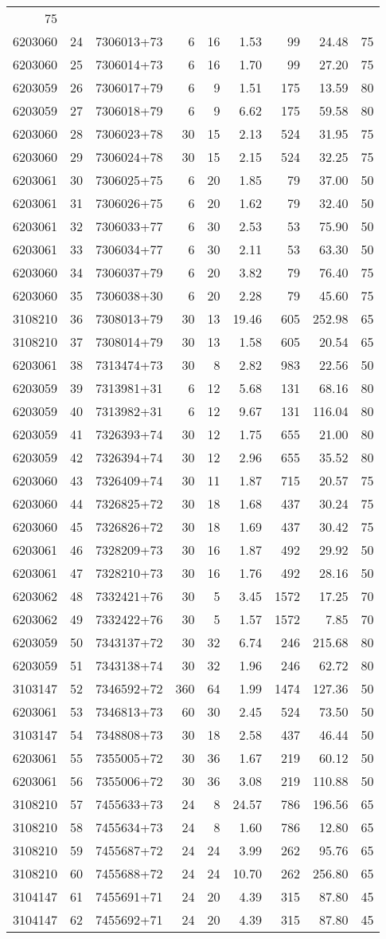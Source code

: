 \documentclass[
]{article}
\begin{document}
\begin{longtable}[]{@{}rrlrrrrrr@{}}
75\tabularnewline
6203060 & 24 & 7306013+73 & 6 & 16 & 1.53 & 99 & 24.48 &
75\tabularnewline
6203060 & 25 & 7306014+73 & 6 & 16 & 1.70 & 99 & 27.20 &
75\tabularnewline
6203059 & 26 & 7306017+79 & 6 & 9 & 1.51 & 175 & 13.59 &
80\tabularnewline
6203059 & 27 & 7306018+79 & 6 & 9 & 6.62 & 175 & 59.58 &
80\tabularnewline
6203060 & 28 & 7306023+78 & 30 & 15 & 2.13 & 524 & 31.95 &
75\tabularnewline
6203060 & 29 & 7306024+78 & 30 & 15 & 2.15 & 524 & 32.25 &
75\tabularnewline
6203061 & 30 & 7306025+75 & 6 & 20 & 1.85 & 79 & 37.00 &
50\tabularnewline
6203061 & 31 & 7306026+75 & 6 & 20 & 1.62 & 79 & 32.40 &
50\tabularnewline
6203061 & 32 & 7306033+77 & 6 & 30 & 2.53 & 53 & 75.90 &
50\tabularnewline
6203061 & 33 & 7306034+77 & 6 & 30 & 2.11 & 53 & 63.30 &
50\tabularnewline
6203060 & 34 & 7306037+79 & 6 & 20 & 3.82 & 79 & 76.40 &
75\tabularnewline
6203060 & 35 & 7306038+30 & 6 & 20 & 2.28 & 79 & 45.60 &
75\tabularnewline
3108210 & 36 & 7308013+79 & 30 & 13 & 19.46 & 605 & 252.98 &
65\tabularnewline
3108210 & 37 & 7308014+79 & 30 & 13 & 1.58 & 605 & 20.54 &
65\tabularnewline
6203061 & 38 & 7313474+73 & 30 & 8 & 2.82 & 983 & 22.56 &
50\tabularnewline
6203059 & 39 & 7313981+31 & 6 & 12 & 5.68 & 131 & 68.16 &
80\tabularnewline
6203059 & 40 & 7313982+31 & 6 & 12 & 9.67 & 131 & 116.04 &
80\tabularnewline
6203059 & 41 & 7326393+74 & 30 & 12 & 1.75 & 655 & 21.00 &
80\tabularnewline
6203059 & 42 & 7326394+74 & 30 & 12 & 2.96 & 655 & 35.52 &
80\tabularnewline
6203060 & 43 & 7326409+74 & 30 & 11 & 1.87 & 715 & 20.57 &
75\tabularnewline
6203060 & 44 & 7326825+72 & 30 & 18 & 1.68 & 437 & 30.24 &
75\tabularnewline
6203060 & 45 & 7326826+72 & 30 & 18 & 1.69 & 437 & 30.42 &
75\tabularnewline
6203061 & 46 & 7328209+73 & 30 & 16 & 1.87 & 492 & 29.92 &
50\tabularnewline
6203061 & 47 & 7328210+73 & 30 & 16 & 1.76 & 492 & 28.16 &
50\tabularnewline
6203062 & 48 & 7332421+76 & 30 & 5 & 3.45 & 1572 & 17.25 &
70\tabularnewline
6203062 & 49 & 7332422+76 & 30 & 5 & 1.57 & 1572 & 7.85 &
70\tabularnewline
6203059 & 50 & 7343137+72 & 30 & 32 & 6.74 & 246 & 215.68 &
80\tabularnewline
6203059 & 51 & 7343138+74 & 30 & 32 & 1.96 & 246 & 62.72 &
80\tabularnewline
3103147 & 52 & 7346592+72 & 360 & 64 & 1.99 & 1474 & 127.36 &
50\tabularnewline
6203061 & 53 & 7346813+73 & 60 & 30 & 2.45 & 524 & 73.50 &
50\tabularnewline
3103147 & 54 & 7348808+73 & 30 & 18 & 2.58 & 437 & 46.44 &
50\tabularnewline
6203061 & 55 & 7355005+72 & 30 & 36 & 1.67 & 219 & 60.12 &
50\tabularnewline
6203061 & 56 & 7355006+72 & 30 & 36 & 3.08 & 219 & 110.88 &
50\tabularnewline
3108210 & 57 & 7455633+73 & 24 & 8 & 24.57 & 786 & 196.56 &
65\tabularnewline
3108210 & 58 & 7455634+73 & 24 & 8 & 1.60 & 786 & 12.80 &
65\tabularnewline
3108210 & 59 & 7455687+72 & 24 & 24 & 3.99 & 262 & 95.76 &
65\tabularnewline
3108210 & 60 & 7455688+72 & 24 & 24 & 10.70 & 262 & 256.80 &
65\tabularnewline
3104147 & 61 & 7455691+71 & 24 & 20 & 4.39 & 315 & 87.80 &
45\tabularnewline
3104147 & 62 & 7455692+71 & 24 & 20 & 4.39 & 315 & 87.80 &
45\tabularnewline
\bottomrule
\end{longtable}
\end{document}
